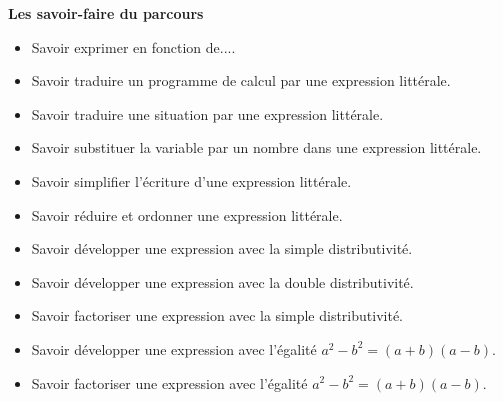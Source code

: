 \documentclass[a4paper,dvipsnames]{article}
\begin{document}
\begin{CpsCol}
\textbf{Les savoir-faire du parcours}
\begin{itemize}
\item Savoir exprimer en fonction de....
\item Savoir traduire un programme de calcul par une expression littérale.
\item Savoir traduire une situation par une expression littérale.
\item Savoir substituer la variable par un nombre dans une expression littérale.  
\item Savoir simplifier l'écriture d'une expression littérale.
\item Savoir réduire et ordonner une expression littérale.      
\item Savoir développer une expression avec la simple distributivité.
\item Savoir développer une expression avec la double distributivité.     
\item Savoir factoriser une expression avec la simple distributivité.
\item Savoir développer une expression avec l'égalité $a^2-b^2=(a+b)(a-b)$.
\item Savoir factoriser une expression avec l'égalité $a^2-b^2=(a+b)(a-b)$.   
\end{itemize}
\end{CpsCol}
\end{document}

